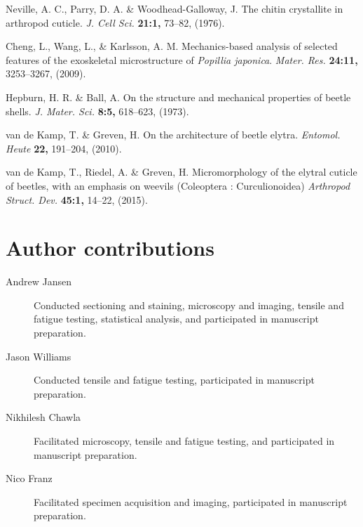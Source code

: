 \documentclass[twocolumn, linenumbers, superscriptaddress]{revtex4-1}
\begin{document}
\begin{thebibliography}{50}
				Neville, A. C., Parry, D. A. \& Woodhead-Galloway, J.
				The chitin crystallite in arthropod cuticle.
				\textit{J. Cell Sci.}
				\textbf{21:1,}
				73--82,
				(1976).
				
				Cheng, L., Wang, L., \& Karlsson, A. M.
				Mechanics-based analysis of selected features of the exoskeletal microstructure of \textit{Popillia japonica}.
				\textit{Mater. Res.}
				\textbf{24:11,}
				3253--3267,
				(2009).
				
				Hepburn, H. R. \& Ball, A.
				On the structure and mechanical properties of beetle shells.
				\textit{J. Mater. Sci.}
				\textbf{8:5,}
				618--623,
				(1973).
				
				van de Kamp, T. \& Greven, H.
				On the architecture of beetle elytra.
				\textit{Entomol. Heute}
				\textbf{22,}
				191--204,
				(2010).
			
				van de Kamp, T., Riedel, A. \& Greven, H.
				Micromorphology of the elytral cuticle of beetles, with an emphasis on weevils (Coleoptera : Curculionoidea)
				\textit{Arthropod Struct. Dev.}
				\textbf{45:1,}
				14--22,
				(2015).
			
	\end{thebibliography}

	\begin{acknowledgements}

	\end{acknowledgements}

	\section*{Author contributions}
		\begin{description}
		\item[Andrew Jansen] Conducted sectioning and staining, microscopy and imaging, tensile and fatigue testing, statistical analysis, and participated in manuscript preparation.
		\item[Jason Williams] Conducted tensile and fatigue testing, participated in manuscript preparation.
		\item[Nikhilesh Chawla] Facilitated microscopy, tensile and fatigue testing, and participated in manuscript preparation.
		\item[Nico Franz] Facilitated specimen acquisition and imaging, participated in manuscript preparation.
		\end{description} 
	
\end{document}
